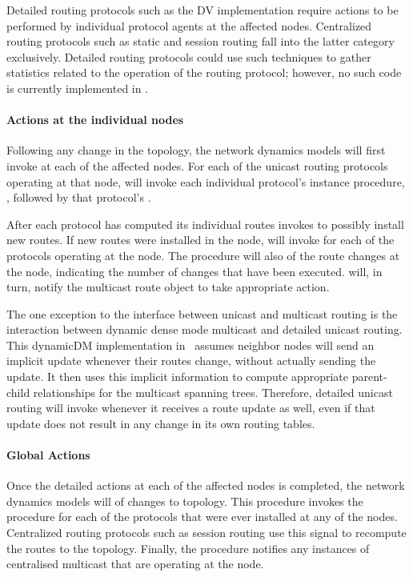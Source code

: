 Detailed routing protocols such as the DV implementation
require actions to be performed by individual protocol agents at the
affected nodes.
Centralized routing protocols such as static and session routing fall into
the latter category exclusively.
Detailed routing protocols could use such techniques to gather statistics
related to the operation of the routing protocol;
however, no such code is currently implemented in \ns.

\paragraph{Actions at the individual nodes}
Following any change in the topology,
the network dynamics models will first invoke
at each of the affected nodes.
For each of the unicast routing protocols operating at that node,
 will invoke 
each individual protocol's instance procedure,  ,
followed by that protocol's .

After each protocol has computed its individual routes
 invokes 
to possibly install new routes.
If new routes were installed in the node,
 will invoke
 for each of the protocols operating at the node.
The procedure will also
of the route changes at the node, indicating the number of changes 
that have been executed.
 will, in turn, notify
the multicast route object to take appropriate action.

The one exception
to the interface between unicast and multicast routing is the interaction
between dynamic dense mode multicast and detailed unicast routing.
This dynamicDM implementation in \ns\ assumes neighbor nodes
will send an implicit update whenever their routes change,
without actually sending the update.  
It then uses this implicit information to compute
appropriate parent-child relationships for the multicast spanning trees.
Therefore, detailed unicast routing will invoke
 whenever it receives a route update as well,
even if that update does not result in any change in its own routing tables.

\paragraph{Global Actions}
Once the detailed actions at each of the affected nodes is completed,
the network dynamics models will
of changes to topology.
This procedure invokes the procedure 
for each of the protocols that were ever installed at any of the nodes.
Centralized routing protocols such as session routing use this signal to
recompute the routes to the topology.
Finally, the  procedure notifies 
any instances of centralised multicast that are operating at the node.

